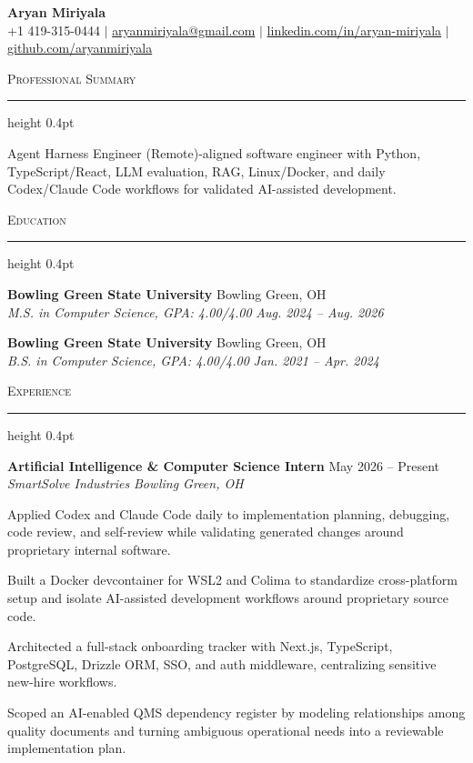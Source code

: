 \documentclass[letterpaper,11pt]{article}
\newcommand{\resumesection}[1]{%
  \par\vspace{2pt}%
  {\large\scshape #1}\par\vspace{2pt}%
  \hrule height 0.4pt\vspace{2pt}%
}
\newcommand{\resumeSubheading}[4]{
  \textbf{#1} \hfill #2\\
  \textit{#3} \hfill \textit{#4}
}
\begin{document}
\begin{center}
  {\LARGE \textbf{Aryan Miriyala}}\\[-1pt]
  \small
  +1 419-315-0444 $|$
  \href{mailto:aryanmiriyala@gmail.com}{aryanmiriyala@gmail.com} $|$
  \href{https://www.linkedin.com/in/aryan-miriyala-7788a21b6/}{linkedin.com/in/aryan-miriyala} $|$
  \href{https://github.com/aryanmiriyala}{github.com/aryanmiriyala}
\end{center}\vspace{-10pt}

\resumesection{Professional Summary}
Agent Harness Engineer (Remote)-aligned software engineer with Python, TypeScript/React, LLM evaluation, RAG, Linux/Docker, and daily Codex/Claude Code workflows for validated AI-assisted development.

\resumesection{Education}
\resumeSubheading
{Bowling Green State University}{Bowling Green, OH}
{M.S. in Computer Science, GPA: 4.00/4.00}{Aug. 2024 -- Aug. 2026}

\resumeSubheading
{Bowling Green State University}{Bowling Green, OH}
{B.S. in Computer Science, GPA: 4.00/4.00}{Jan. 2021 -- Apr. 2024}

\resumesection{Experience}
\resumeSubheading
{Artificial Intelligence \& Computer Science Intern}{May 2026 -- Present}
{SmartSolve Industries}{Bowling Green, OH}
\begin{tightitemize}
  \item Applied Codex and Claude Code daily to implementation planning, debugging, code review, and self-review while validating generated changes around proprietary internal software.
  \item Built a Docker devcontainer for WSL2 and Colima to standardize cross-platform setup and isolate AI-assisted development workflows around proprietary source code.
  \item Architected a full-stack onboarding tracker with Next.js, TypeScript, PostgreSQL, Drizzle ORM, SSO, and auth middleware, centralizing sensitive new-hire workflows.
  \item Scoped an AI-enabled QMS dependency register by modeling relationships among quality documents and turning ambiguous operational needs into a reviewable implementation plan.
\end{tightitemize}
\end{document}
